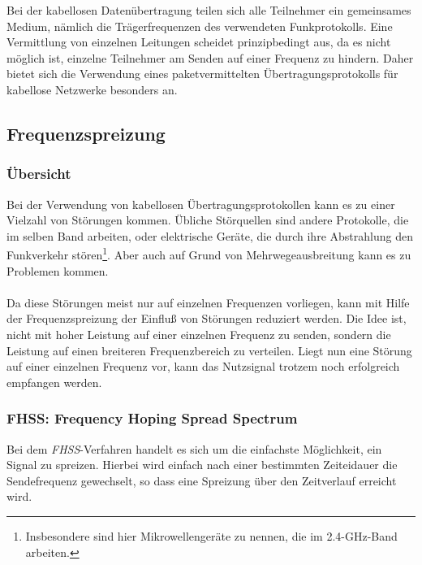         Bei der kabellosen Datenübertragung teilen sich alle Teilnehmer ein gemeinsames Medium, nämlich die 
        Trägerfrequenzen des verwendeten Funkprotokolls. Eine Vermittlung von einzelnen Leitungen scheidet 
        prinzipbedingt aus, da es nicht möglich ist, einzelne Teilnehmer am Senden auf einer Frequenz zu 
        hindern. Daher bietet sich die Verwendung eines paketvermittelten Übertragungsprotokolls für kabellose
        Netzwerke besonders an.
        
    \subsection{Frequenzspreizung}
        \subsubsection{Übersicht}
            Bei der Verwendung von kabellosen Übertragungsprotokollen kann es zu einer Vielzahl von 
            Störungen kommen. Übliche Störquellen sind andere Protokolle, die im selben Band arbeiten,
            oder elektrische Geräte, die durch ihre Abstrahlung den Funkverkehr stören\footnote{Insbesondere
            sind hier Mikrowellengeräte zu nennen, die im 2.4-GHz-Band arbeiten.}. Aber auch auf Grund von 
            Mehrwegeausbreitung kann es zu Problemen kommen.\\
            \\
            Da diese Störungen meist nur auf einzelnen Frequenzen vorliegen, kann mit Hilfe der 
            Frequenzspreizung der Einfluß von Störungen reduziert werden. Die Idee ist, nicht mit
            hoher Leistung auf einer einzelnen Frequenz zu senden, sondern die Leistung auf einen
            breiteren Frequenzbereich zu verteilen. Liegt nun eine Störung auf einer einzelnen
            Frequenz vor, kann das Nutzsignal trotzem noch erfolgreich empfangen werden.

        \subsubsection{FHSS: Frequency Hoping Spread Spectrum}\label{FHSS}
            Bei dem \textsl{FHSS}-Verfahren handelt es sich um die einfachste Möglichkeit, ein
            Signal zu spreizen. Hierbei wird einfach nach einer bestimmten Zeiteidauer die
            Sendefrequenz gewechselt, so dass eine Spreizung über den Zeitverlauf erreicht wird.
            \cite{RC-Network}

